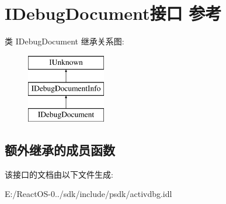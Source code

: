 \hypertarget{interface_i_debug_document}{}\section{I\+Debug\+Document接口 参考}
\label{interface_i_debug_document}
类 I\+Debug\+Document 继承关系图\+:\begin{figure}[H]
\begin{center}
\leavevmode
\includegraphics[height=3.000000cm]{interface_i_debug_document}
\end{center}
\end{figure}
\subsection*{额外继承的成员函数}


该接口的文档由以下文件生成\+:\begin{DoxyCompactItemize}
\item 
E\+:/\+React\+O\+S-\/0../sdk/include/psdk/activdbg.\+idl\end{DoxyCompactItemize}
